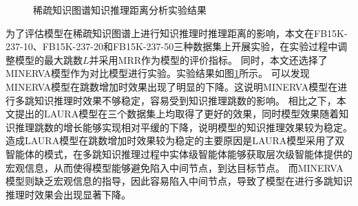 \documentclass[algorithmlist, AutoFakeBold, AutoFakeSlant, figurelist, tablelist, nomlist, engineering]{seuthesix}
\begin{document}
\begin{figure}[t]
  \centering
  \caption{稀疏知识图谱知识推理距离分析实验结果}
  \label{Experiment2_multihop}
\end{figure}
为了评估模型在稀疏知识图谱上进行知识推理时推理距离的影响，本文在FB15K-237-10、FB15K-237-20和FB15K-237-50三种数据集上开展实验，在实验过程中调整模型的最大跳数$L$并采用MRR作为模型的评价指标。
同时，本文还选择了MINERVA模型作为对比模型进行实验。实验结果如图\ref{Experiment2_multihop}所示。
可以发现MINERVA模型在跳数增加时效果出现了明显的下降。这说明MINERVA模型在进行多跳知识推理时效果不够稳定，容易受到知识推理跳数的影响。
相比之下，本文提出的LAURA模型在三个数据集上均取得了更好的效果，同时模型效果随着知识推理跳数的增长能够实现相对平缓的下降，说明模型的知识推理效果较为稳定。
造成LAURA模型在跳数增加时效果较为稳定的主要原因是LAURA模型采用了双智能体的模式，在多跳知识推理过程中实体级智能体能够获取层次级智能体提供的宏观信息，从而使得模型能够避免陷入中间节点，到达目标节点。
而MINERVA模型则缺乏宏观信息的指导，因此容易陷入中间节点，导致了模型在进行多跳知识推理时效果会出现显著下降。
\end{document}
